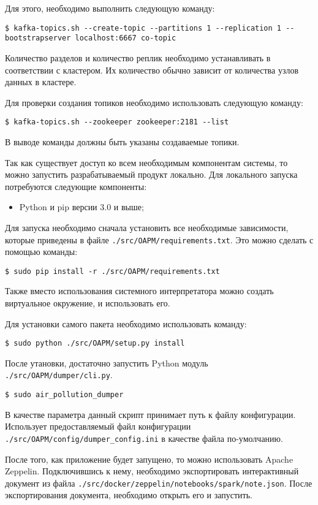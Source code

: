 Для этого, необходимо выполнить следующую команду:
\begin{lstlisting}    
$ kafka-topics.sh --create-topic --partitions 1 --replication 1 --bootstrapserver localhost:6667 co-topic
\end{lstlisting}
Количество разделов и количество реплик необходимо устанавливать в соответствии с кластером.
Их количество обычно зависит от количества узлов данных в кластере.

Для проверки создания топиков необходимо использовать следующую команду:
\begin{lstlisting}
$ kafka-topics.sh --zookeeper zookeeper:2181 --list
\end{lstlisting}
В выводе команды должны быть указаны создаваемые топики.

Так как существует доступ ко всем необходимым компонентам системы, то можно запустить разрабатываемый продукт локально.
Для локального запуска потребуются следующие компоненты:

\begin{itemize}
    \item Python и pip версии 3.0 и выше;
\end{itemize}

Для запуска необходимо сначала установить все необходимые зависимости, которые приведены в файле \texttt{./src/OAPM/requirements.txt}.
Это можно сделать с помощью команды:
\begin{lstlisting}
$ sudo pip install -r ./src/OAPM/requirements.txt
\end{lstlisting}
Также вместо использования системного интерпретатора можно создать виртуальное окружение, и использовать его.

Для установки самого пакета необходимо использовать команду:
\begin{lstlisting}
$ sudo python ./src/OAPM/setup.py install
\end{lstlisting}

После утановки, достаточно запустить Python модуль \texttt{./src/OAPM/dumper/cli.py}.
\begin{lstlisting}
$ sudo air_pollution_dumper
\end{lstlisting}

В качестве параметра данный скрипт принимает путь к файлу конфигурации.
Использует предоставляемый файл конфигурации \texttt{./src/OAPM/config/dumper\_config.ini} в качестве файла по-умолчанию.

После того, как приложение будет запущено, то можно использовать Apache Zeppelin.
Подключившись к нему, необходимо экспортировать интерактивный документ из файла \texttt{./src/docker/zeppelin/notebooks/spark/note.json}.
После экспортирования документа, необходимо открыть его и запустить.

